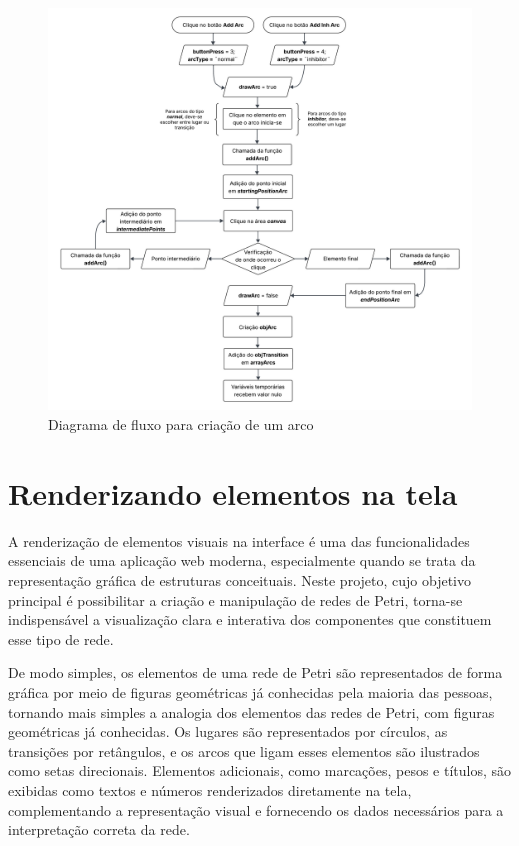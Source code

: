 \documentclass[
	12pt,				%
	openright,			%
	oneside,			%
	a4paper,			%
	english,			%
	brazil				%
	]{abntex2}
\begin{document}
\begin{figure}[ht] 
	\centering
	\includegraphics[scale=0.12]{figuras/diagrama-fluxo-addArc.png}
	\caption[Diagrama de fluxo para criação de um Arco]{Diagrama de fluxo para criação de um arco}
	\label{fig:addArcDiagram}
\end{figure}
\FloatBarrier

\section{Renderizando elementos na tela}

A renderização de elementos visuais na interface é uma das funcionalidades essenciais de uma aplicação web moderna, especialmente quando se trata da representação gráfica de estruturas conceituais. Neste projeto, cujo objetivo principal é possibilitar a criação e manipulação de redes de Petri, torna-se indispensável a visualização clara e interativa dos componentes que constituem esse tipo de rede.

De modo simples, os elementos de uma rede de Petri são representados de forma gráfica por meio de figuras geométricas já conhecidas pela maioria das pessoas, tornando mais simples a analogia dos elementos das redes de Petri, com figuras geométricas já conhecidas. Os lugares são representados por círculos, as transições por retângulos, e os arcos que ligam esses elementos são ilustrados como setas direcionais. Elementos adicionais, como marcações, pesos e títulos, são exibidas como textos e números renderizados diretamente na tela, complementando a representação visual e fornecendo os dados necessários para a interpretação correta da rede.
\end{document}
